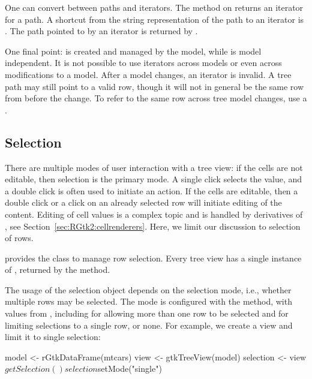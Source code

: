 One can convert between paths and iterators. The method
 on  returns an
iterator for a path. A shortcut from the string representation of the
path to an iterator is . The
path pointed to by an iterator is returned by
.

One final point:  is created and managed by the
model, while  is model independent. It is not
possible to use iterators across models or even across modifications
to a model. After a model changes, an iterator is invalid. A tree path
may still point to a valid row, though it will not in general be the
same row from before the change. To refer to the same row across tree
model changes, use a .

\subsection{Selection}

There are multiple modes of user interaction with a tree view: if the
cells are not editable, then selection is the primary mode.  A single
click selects the value, and a double click is often used to initiate
an action. If the cells are editable, then a double click or a click
on an already selected row will initiate editing of the
content. Editing of cell values is a complex topic and is handled by
derivatives of , see
Section~\ref{sec:RGtk2:cellrenderers}. Here, we limit our discussion
to selection of rows.

\GTK\/ provides the class  to manage row
selection. Every tree view has a single instance of
, returned by the
 method.

The usage of the selection object depends on the selection mode, i.e.,
whether multiple rows may be selected. The mode is configured with the
 method, with values from
, including  for allowing more
than one row to be selected and  for limiting selections
to a single row, or none. For example, we create a view and limit it
to single selection:
\begin{Schunk}
\begin{Sinput}
 model <- rGtkDataFrame(mtcars)
 view <- gtkTreeView(model)
 selection <- view$getSelection()
 selection$setMode("single")
\end{Sinput}
\end{Schunk}

